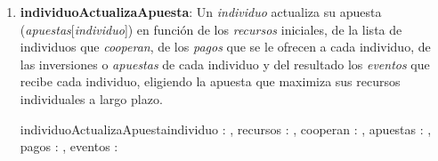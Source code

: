 \documentclass[10pt,a4paper]{article}
\begin{document}
\begin{enumerate}
\begin{proc}{individuoDecideSiCooperarONo}{\In individuo: \nat, \In recursos: \TLista{\float}, \Inout cooperan: \TLista{\bool}, \In apuestas: \matriz{\float}, \In pagos: \matriz{\float}, \In eventos: \matriz{\nat}}{}
\end{proc}
\vspace{8pt}

\vspace{32pt}

\item \textbf{individuoActualizaApuesta}:  Un \textit{individuo} actualiza su apuesta (\textit{apuestas}[\textit{individuo}]) en función de los \textit{recursos} iniciales, de la lista de individuos que \textit{cooperan}, de los \textit{pagos} que se le ofrecen a cada individuo, de las inversiones o \textit{apuestas} de cada individuo y del resultado los \textit{eventos} que recibe cada individuo, eligiendo la apuesta que maximiza sus recursos individuales a largo plazo.

\vspace{16pt}

\begin{proc}{individuoActualizaApuesta}{\In individuo : \nat, \In recursos : \TLista{\float}, \In cooperan : \TLista{\bool}, \Inout apuestas : \TLista{\TLista{\float}}, \In pagos : \TLista{\TLista{\float}}, \In eventos : \TLista{\TLista{\nat}}}{}{

    \vspace{\baselineskip}
    
}
\end{proc}
\end{enumerate}
\end{document}
